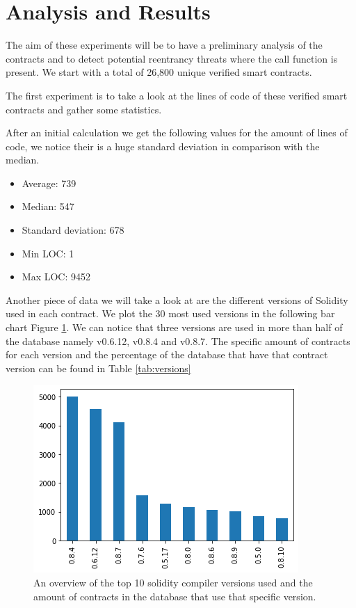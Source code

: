 \documentclass[sigconf]{acmart}
\begin{document}
\section{Analysis and Results}

The aim of these experiments will be to have a preliminary analysis of the contracts and to detect potential reentrancy threats where the call function is present. We start with a total of 26,800 unique verified smart contracts. 



The first experiment is to take a look at the lines of code of these verified smart contracts and gather some statistics.

After an initial calculation we get the following values for the amount of lines of code, we notice their is a huge standard deviation in comparison with the median.
\begin{itemize}
    \item Average: 739
    \item Median: 547
    \item Standard deviation: 678
    \item Min LOC: 1
    \item Max LOC: 9452
\end{itemize}

Another piece of data we will take a look at are the different versions of Solidity used in each contract. We plot the 30 most used versions in the following bar chart Figure \ref{fig:compiler}. We can notice that three versions are used in more than half of the database namely v0.6.12, v0.8.4 and v0.8.7. The specific amount of contracts for each version and the percentage of the database that have that contract version can be found in Table \ref{tab:versions}
\begin{figure}[h]
  \centering
  \includegraphics[width=\linewidth]{img/versions_v3.png}
  \caption{An overview of the top 10 solidity compiler versions used and the amount of contracts in the database that use that specific version. }
  \label{fig:compiler}
\end{figure}
\end{document}
